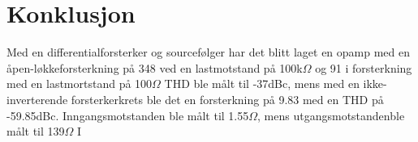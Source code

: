 \section{Konklusjon}
\label{sec:conclusion}

Med en differentialforsterker og sourcefølger har det blitt laget en opamp med en åpen-løkkeforsterkning på 348 ved en lastmotstand på 100k$\Omega$ og 91 i forsterkning med en lastmortstand på 100$\Omega$ THD ble målt til -37dBc, mens med en ikke-inverterende forsterkerkrets ble det en forsterkning på 9.83 med en THD på -59.85dBc. Inngangsmotstanden ble målt til 1.55$\Omega$, mens utgangsmotstandenble målt til 139$\Omega$
I 
